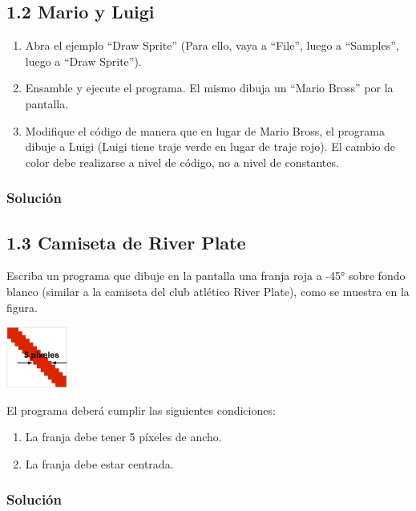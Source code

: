 \documentclass{article}
\begin{document}
\subsection*{1.2 Mario y Luigi}

\begin{enumerate}[label=\alph*)]
    \item Abra el ejemplo “Draw Sprite” (Para ello, vaya a “File”, luego a “Samples”, luego a “Draw Sprite”).
    \item Ensamble y ejecute el programa. El mismo dibuja un “Mario Bross” por la pantalla.
    \item Modifique el código de manera que en lugar de Mario Bross, el programa dibuje a Luigi (Luigi tiene traje verde en lugar de traje rojo). El cambio de color debe realizarse a nivel de código, no a nivel de constantes.
\end{enumerate}

\subsubsection*{Solución}

\subsection*{1.3 Camiseta de River Plate}

Escriba un programa que dibuje en la pantalla una franja roja a -45° sobre fondo blanco (similar a la camiseta del club atlético River Plate), como se muestra en la figura.

\begin{center}
    \includegraphics*[width=76px]{./img/ej1.3.png}
\end{center}

El programa deberá cumplir las siguientes condiciones:

\begin{enumerate}[label=\alph*)]
    \item La franja debe tener 5 píxeles de ancho.
    \item La franja debe estar centrada.
\end{enumerate}

\subsubsection*{Solución}
\end{document}
